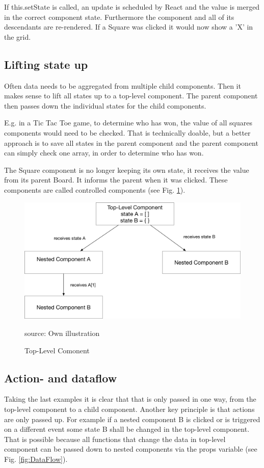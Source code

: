 If this.setState is called, an update is scheduled by React and the value is merged in the correct component state. Furthermore the component and all of its descendants are re-rendered. If a Square was clicked it would now show a 'X' in the grid.

\subsection{Lifting state up}
Often data needs to be aggregated from multiple child components. Then it makes sense to lift all states up to a top-level component. The parent component then passes down the individual states for the child components.

E.g. in a Tic Tac Toe game, to determine who has won, the value of all squares components would need to be checked. That is technically doable, but a better approach is to save all states in the parent component and the parent component can simply check one array, in order to determine who has won. 

The Square component is no longer keeping its own state, it receives the value from its parent Board. It informs the parent when it was clicked. These components are called controlled components  (see Fig. \ref{fig:TopLevel}).

\begin{figure}[H]
	\centering
	\includegraphics[width=0.8\linewidth]{bilder/grundlagen/topLevelComponent.png}
	\caption{Top-Level Comonent} source: Own illustration
	\label{fig:TopLevel}
\end{figure}


\subsection{Action- and dataflow}
Taking the last examples it is clear that that is only passed in one way, from the top-level component to a child component. Another key principle is that actions are only passed up. For example if a nested component B is clicked or is triggered on a different event some state B shall be changed in the top-level component. That is possible because all functions that change the data in top-level component can be passed down to nested components via the props variable (see Fig. \ref{fig:DataFlow}).


